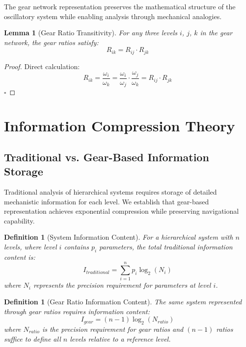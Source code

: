 \documentclass[11pt]{article}
\newtheorem{lemma}[theorem]{Lemma}
\newtheorem{definition}[theorem]{Definition}
\theoremstyle{remark}
\begin{document}
The gear network representation preserves the mathematical structure of the oscillatory system while enabling analysis through mechanical analogies.

\begin{lemma}[Gear Ratio Transitivity]
For any three levels $i$, $j$, $k$ in the gear network, the gear ratios satisfy:
\begin{equation}
R_{ik} = R_{ij} \cdot R_{jk}
\label{eq:gear_ratio_transitivity}
\end{equation}
\end{lemma}

\begin{proof}
Direct calculation:
$$R_{ik} = \frac{\omega_i}{\omega_k} = \frac{\omega_i}{\omega_j} \cdot \frac{\omega_j}{\omega_k} = R_{ij} \cdot R_{jk}$$
$\square$
\end{proof}

\section{Information Compression Theory}

\subsection{Traditional vs. Gear-Based Information Storage}

Traditional analysis of hierarchical systems requires storage of detailed mechanistic information for each level. We establish that gear-based representation achieves exponential compression while preserving navigational capability.

\begin{definition}[System Information Content]
For a hierarchical system with $n$ levels, where level $i$ contains $p_i$ parameters, the total traditional information content is:
\begin{equation}
I_{traditional} = \sum_{i=1}^{n} p_i \log_2(N_i)
\label{eq:traditional_information}
\end{equation}
where $N_i$ represents the precision requirement for parameters at level $i$.
\end{definition}

\begin{definition}[Gear Ratio Information Content]
The same system represented through gear ratios requires information content:
\begin{equation}
I_{gear} = (n-1) \log_2(N_{ratio})
\label{eq:gear_information}
\end{equation}
where $N_{ratio}$ is the precision requirement for gear ratios and $(n-1)$ ratios suffice to define all $n$ levels relative to a reference level.
\end{definition}
\end{document}
